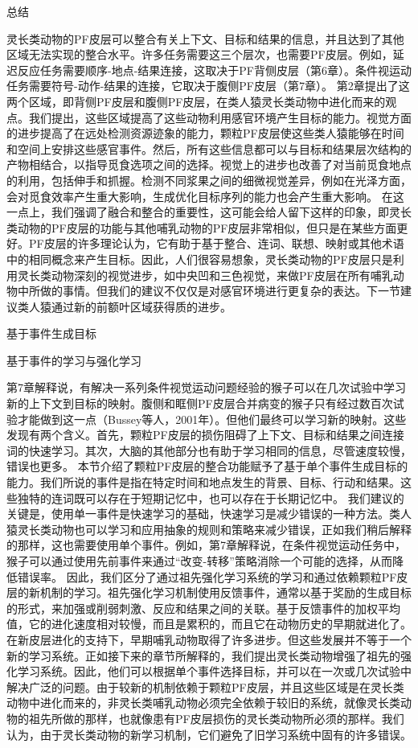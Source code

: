 总结

灵长类动物的PF皮层可以整合有关上下文、目标和结果的信息，并且达到了其他区域无法实现的整合水平。许多任务需要这三个层次，也需要PF皮层。例如，延迟反应任务需要顺序-地点-结果连接，这取决于PF背侧皮层（第6章）。条件视运动任务需要符号-动作-结果的连接，它取决于腹侧PF皮层（第7章）。
第2章提出了这两个区域，即背侧PF皮层和腹侧PF皮层，在类人猿灵长类动物中进化而来的观点。我们提出，这些区域提高了这些动物利用感官环境产生目标的能力。视觉方面的进步提高了在远处检测资源迹象的能力，颗粒PF皮层使这些类人猿能够在时间和空间上安排这些感官事件。然后，所有这些信息都可以与目标和结果层次结构的产物相结合，以指导觅食选项之间的选择。视觉上的进步也改善了对当前觅食地点的利用，包括伸手和抓握。检测不同浆果之间的细微视觉差异，例如在光泽方面，会对觅食效率产生重大影响，生成优化目标序列的能力也会产生重大影响。
在这一点上，我们强调了融合和整合的重要性，这可能会给人留下这样的印象，即灵长类动物的PF皮层的功能与其他哺乳动物的PF皮层非常相似，但只是在某些方面更好。PF皮层的许多理论认为，它有助于基于整合、连词、联想、映射或其他术语中的相同概念来产生目标。因此，人们很容易想象，灵长类动物的PF皮层只是利用灵长类动物深刻的视觉进步，如中央凹和三色视觉，来做PF皮层在所有哺乳动物中所做的事情。但我们的建议不仅仅是对感官环境进行更复杂的表达。下一节建议类人猿通过新的前额叶区域获得质的进步。


基于事件生成目标

基于事件的学习与强化学习

第7章解释说，有解决一系列条件视觉运动问题经验的猴子可以在几次试验中学习新的上下文到目标的映射。腹侧和眶侧PF皮层合并病变的猴子只有经过数百次试验才能做到这一点（Bussey等人，2001年）。但他们最终可以学习新的映射。这些发现有两个含义。首先，颗粒PF皮层的损伤阻碍了上下文、目标和结果之间连接词的快速学习。其次，大脑的其他部分也有助于学习相同的信息，尽管速度较慢，错误也更多。
本节介绍了颗粒PF皮层的整合功能赋予了基于单个事件生成目标的能力。我们所说的事件是指在特定时间和地点发生的背景、目标、行动和结果。这些独特的连词既可以存在于短期记忆中，也可以存在于长期记忆中。
我们建议的关键是，使用单一事件是快速学习的基础，快速学习是减少错误的一种方法。类人猿灵长类动物也可以学习和应用抽象的规则和策略来减少错误，正如我们稍后解释的那样，这也需要使用单个事件。例如，第7章解释说，在条件视觉运动任务中，猴子可以通过使用先前事件来通过“改变-转移”策略消除一个可能的选择，从而降低错误率。
因此，我们区分了通过祖先强化学习系统的学习和通过依赖颗粒PF皮层的新机制的学习。祖先强化学习机制使用反馈事件，通常以基于奖励的生成目标的形式，来加强或削弱刺激、反应和结果之间的关联。基于反馈事件的加权平均值，它的进化速度相对较慢，而且是累积的，而且它在动物历史的早期就进化了。
在新皮层进化的支持下，早期哺乳动物取得了许多进步。但这些发展并不等于一个新的学习系统。正如接下来的章节所解释的，我们提出灵长类动物增强了祖先的强化学习系统。因此，他们可以根据单个事件选择目标，并可以在一次或几次试验中解决广泛的问题。由于较新的机制依赖于颗粒PF皮层，并且这些区域是在灵长类动物中进化而来的，非灵长类哺乳动物必须完全依赖于较旧的系统，就像灵长类动物的祖先所做的那样，也就像患有PF皮层损伤的灵长类动物所必须的那样。我们认为，由于灵长类动物的新学习机制，它们避免了旧学习系统中固有的许多错误。










